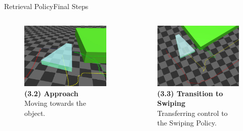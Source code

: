\documentclass[AIRbeamer
,optEnglish
,optBiber
,optBibstyleAlphabetic
,optBeamerClassicFormat%
]{AIRlatex}
\begin{document}
    \begin{frame}[c]{Retrieval Policy}{Final Steps}
        \begin{columns}[T,onlytextwidth]
            \begin{column}[T]{0.48\textwidth}
                \begin{figure}[H]
                    \centering
                    \includegraphics[width=\textwidth]{figures/retrieval/approach}
                    \caption{\textbf{(3.2) Approach}\\Moving towards the object.}
                \end{figure}
            \end{column}
            \begin{column}[T]{0.48\textwidth}
                \begin{figure}[H]
                    \centering
                    \includegraphics[width=\textwidth]{figures/retrieval/trajectory}
                    \caption{\textbf{(3.3) Transition to Swiping}\\Transferring control to the Swiping Policy.}
                \end{figure}
            \end{column}
        \end{columns}
    \end{frame}
\end{document}

